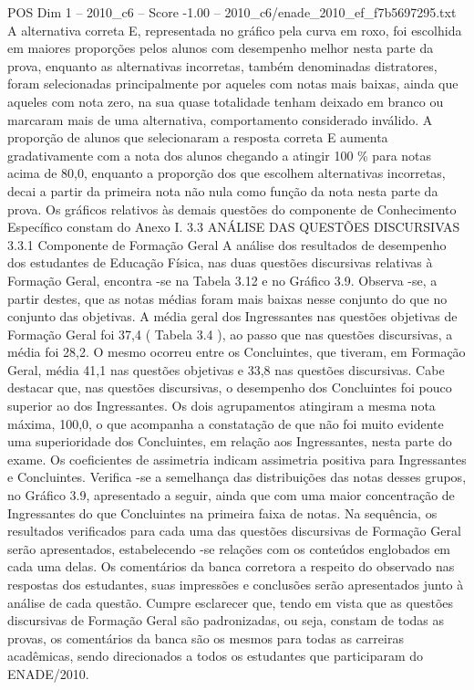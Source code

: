 \begin{textsample}{POS Dim 1 – 2010\_c6 – Score -1.00 – 2010\_c6/enade\_2010\_ef\_f7b5697295.txt}
A alternativa correta E, representada no gráfico pela curva em roxo, foi escolhida em maiores proporções pelos alunos com desempenho melhor nesta parte da prova, enquanto as alternativas incorretas, também denominadas distratores, foram selecionadas principalmente por aqueles com notas mais baixas, ainda que aqueles com nota zero, na sua quase totalidade tenham deixado em branco ou marcaram mais de uma alternativa, comportamento considerado inválido.
A proporção de alunos que selecionaram a resposta correta E aumenta gradativamente com a nota dos alunos chegando a atingir 100 \% para notas acima de 80,0, enquanto a proporção dos que escolhem alternativas incorretas, decai a partir da primeira nota não nula como função da nota nesta parte da prova.
Os gráficos relativos às demais questões do componente de Conhecimento Específico constam do Anexo I. 3.3 ANÁLISE DAS QUESTÕES DISCURSIVAS 3.3.1 Componente de Formação Geral A análise dos resultados de desempenho dos estudantes de Educação Física, nas duas questões discursivas relativas à Formação Geral, encontra -se na Tabela 3.12 e no Gráfico 3.9.
Observa -se, a partir destes, que as notas médias foram mais baixas nesse conjunto do que no conjunto das objetivas.
A média geral dos Ingressantes nas questões objetivas de Formação Geral foi 37,4 ( Tabela 3.4 ), ao passo que nas questões discursivas, a média foi 28,2.
O mesmo ocorreu entre os Concluintes, que tiveram, em Formação Geral, média 41,1 nas questões objetivas e 33,8 nas questões discursivas.
Cabe destacar que, nas questões discursivas, o desempenho dos Concluintes foi pouco superior ao dos Ingressantes.
Os dois agrupamentos atingiram a mesma nota máxima, 100,0, o que acompanha a constatação de que não foi muito evidente uma superioridade dos Concluintes, em relação aos Ingressantes, nesta parte do exame.
Os coeficientes de assimetria indicam assimetria positiva para Ingressantes e Concluintes.
Verifica -se a semelhança das distribuições das notas desses grupos, no Gráfico 3.9, apresentado a seguir, ainda que com uma maior concentração de Ingressantes do que Concluintes na primeira faixa de notas.
Na sequência, os resultados verificados para cada uma das questões discursivas de Formação Geral serão apresentados, estabelecendo -se relações com os conteúdos englobados em cada uma delas.
Os comentários da banca corretora a respeito do observado nas respostas dos estudantes, suas impressões e conclusões serão apresentados junto à análise de cada questão.
Cumpre esclarecer que, tendo em vista que as questões discursivas de Formação Geral são padronizadas, ou seja, constam de todas as provas, os comentários da banca são os mesmos para todas as carreiras acadêmicas, sendo direcionados a todos os estudantes que participaram do ENADE/2010.

\end{textsample}
